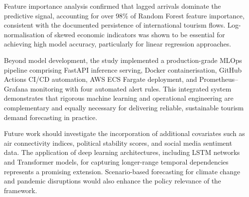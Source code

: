 \documentclass[conference]{IEEEtran}
\begin{document}
Feature importance analysis confirmed that lagged arrivals
dominate the predictive signal, accounting for over 98\%
of Random Forest feature importance, consistent with the
documented persistence of international tourism flows.
Log-normalisation of skewed economic indicators was shown
to be essential for achieving high model accuracy,
particularly for linear regression approaches.

Beyond model development, the study implemented a
production-grade MLOps pipeline comprising FastAPI
inference serving, Docker containerisation, GitHub Actions
CI/CD automation, AWS ECS Fargate deployment, and
Prometheus--Grafana monitoring with four automated alert
rules. This integrated system demonstrates that rigorous
machine learning and operational engineering are
complementary and equally necessary for delivering
reliable, sustainable tourism demand forecasting in
practice.

Future work should investigate the incorporation of
additional covariates such as air connectivity indices,
political stability scores, and social media sentiment data.
The application of deep learning architectures, including
LSTM networks and Transformer models, for capturing
longer-range temporal dependencies represents a
promising extension. Scenario-based forecasting for
climate change and pandemic disruptions would also
enhance the policy relevance of the framework.
\end{document}
